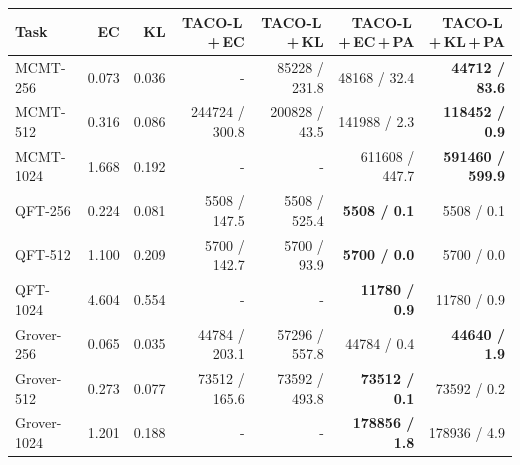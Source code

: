 \begin{tabular}{lrrrrrr}
\hline
Task & EC & KL & TACO-L\,+\,EC & TACO-L\,+\,KL & TACO-L\,+\,EC\,+\,PA & TACO-L\,+\,KL\,+\,PA \\
\hline
MCMT-256 & 0.073 & 0.036 & - & 85228 / 231.8 & 48168 / 32.4 & \textbf{44712 / 83.6} \\
MCMT-512 & 0.316 & 0.086 & 244724 / 300.8 & 200828 / 43.5 & 141988 / 2.3 & \textbf{118452 / 0.9} \\
MCMT-1024 & 1.668 & 0.192 & - & - & 611608 / 447.7 & \textbf{591460 / 599.9} \\
QFT-256 & 0.224 & 0.081 & 5508 / 147.5 & 5508 / 525.4 & \textbf{5508 / 0.1} & 5508 / 0.1 \\
QFT-512 & 1.100 & 0.209 & 5700 / 142.7 & 5700 / 93.9 & \textbf{5700 / 0.0} & 5700 / 0.0 \\
QFT-1024 & 4.604 & 0.554 & - & - & \textbf{11780 / 0.9} & 11780 / 0.9 \\
Grover-256 & 0.065 & 0.035 & 44784 / 203.1 & 57296 / 557.8 & 44784 / 0.4 & \textbf{44640 / 1.9} \\
Grover-512 & 0.273 & 0.077 & 73512 / 165.6 & 73592 / 493.8 & \textbf{73512 / 0.1} & 73592 / 0.2 \\
Grover-1024 & 1.201 & 0.188 & - & - & \textbf{178856 / 1.8} & 178936 / 4.9 \\
\hline
\end{tabular}
